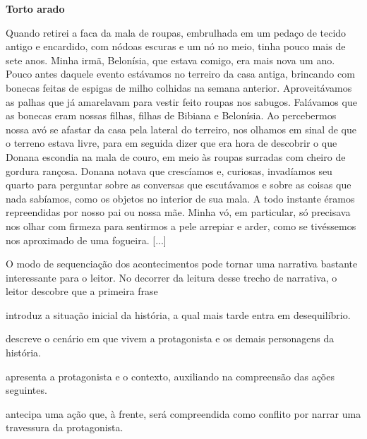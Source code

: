 \begin{myquote}
\textbf{Torto arado}

Quando retirei a faca da mala de roupas, embrulhada em um pedaço de
tecido antigo e encardido, com nódoas escuras e um nó no meio, tinha
pouco mais de sete anos. Minha irmã, Belonísia, que estava comigo, era
mais nova um ano. Pouco antes daquele evento estávamos no terreiro da
casa antiga, brincando com bonecas feitas de espigas de milho colhidas
na semana anterior. Aproveitávamos as palhas que já amarelavam para
vestir feito roupas nos sabugos. Falávamos que as bonecas eram nossas
filhas, filhas de Bibiana e Belonísia. Ao percebermos nossa avó se
afastar da casa pela lateral do terreiro, nos olhamos em sinal de que o
terreno estava livre, para em seguida dizer que era hora de descobrir o
que Donana escondia na mala de couro, em meio às roupas surradas com
cheiro de gordura rançosa. Donana notava que crescíamos e, curiosas,
invadíamos seu quarto para perguntar sobre as conversas que escutávamos
e sobre as coisas que nada sabíamos, como os objetos no interior de sua
mala. A todo instante éramos repreendidas por nosso pai ou nossa mãe.
Minha vó, em particular, só precisava nos olhar com firmeza para
sentirmos a pele arrepiar e arder, como se tivéssemos nos aproximado de
uma fogueira. {[}...{]}

\end{myquote}

O modo de sequenciação dos acontecimentos pode tornar uma narrativa
bastante interessante para o leitor. No decorrer da leitura desse trecho
de narrativa, o leitor descobre que a primeira frase

\begin{escolha}
\item introduz a situação inicial da história, a qual mais tarde entra em
desequilíbrio.

\item descreve o cenário em que vivem a protagonista e os demais
personagens da história.

\item apresenta a protagonista e o contexto, auxiliando na compreensão das
ações seguintes.

\item antecipa uma ação que, à frente, será compreendida como conflito por
narrar uma travessura da protagonista.
\end{escolha}

